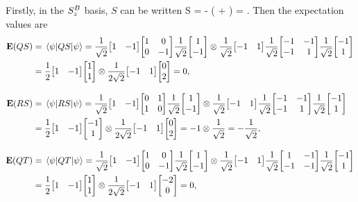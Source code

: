 \begin{solution}
	Firstly, in the $S_z^B$ basis, $S$ can be written
	\beq
		S = - \left( \mqty[ 0 & 1 \\ 1 & 0 ] + \mqty[ 1 & 0 \\ 0 & -1 ] \right)
		=  \mqty[ -1 & -1 \\ -1 & 1 ].
	\eeq
	\clearpage
	Then the expectation values are
	\begin{align*}
		\vE(QS) &= \ev{Q S}{\psi}
		= \frac{1}{\sqrt{2}} \mqty[ 1 & -1 ] \mqty[ 1 & 0 \\ 0 & -1 ] \frac{1}{\sqrt{2}} \mqty[ 1 \\ -1 ] \otimes \frac{1}{\sqrt{2}} \mqty[ -1 & 1 ] \frac{1}{\sqrt{2}} \mqty[ -1 & -1 \\ -1 & 1 ] \frac{1}{\sqrt{2}} \mqty[ -1 \\ 1 ] \\
		&= \frac{1}{2} \mqty[ 1 & -1 ] \mqty[ 1 \\ 1 ] \otimes \frac{1}{2 \sqrt{2}} \mqty[ -1 & 1 ] \mqty[ 0 \\ 2 ]
		= 0, \\[2ex]
		\vE(RS) &= \ev{R S}{\psi}
		= \frac{1}{\sqrt{2}} \mqty[ 1 & -1 ] \mqty[ 0 & 1 \\ 1 & 0 ] \frac{1}{\sqrt{2}} \mqty[ 1 \\ -1 ] \otimes \frac{1}{\sqrt{2}} \mqty[ -1 & 1 ] \frac{1}{\sqrt{2}} \mqty[ -1 & -1 \\ -1 & 1 ] \frac{1}{\sqrt{2}} \mqty[ -1 \\ 1 ] \\
		&= \frac{1}{2} \mqty[ 1 & -1 ] \mqty[ -1 \\ 1 ] \otimes \frac{1}{2 \sqrt{2}} \mqty[ -1 & 1 ] \mqty[ 0 \\ 2 ]
		= -1 \otimes \frac{1}{\sqrt{2}}
		= -\frac{1}{\sqrt{2}}, \\[2ex]
		\vE(QT) &= \ev{Q T}{\psi}
		= \frac{1}{\sqrt{2}} \mqty[ 1 & -1 ] \mqty[ 1 & 0 \\ 0 & -1 ] \frac{1}{\sqrt{2}} \mqty[ 1 \\ -1 ] \otimes \frac{1}{\sqrt{2}} \mqty[ -1 & 1 ] \frac{1}{\sqrt{2}} \mqty[ 1 & -1 \\ -1 & -1 ] \frac{1}{\sqrt{2}} \mqty[ -1 \\ 1 ] \\
		&= \frac{1}{2} \mqty[ 1 & -1 ] \mqty[ 1 \\ 1 ] \otimes \frac{1}{2 \sqrt{2}} \mqty[ -1 & 1 ] \mqty[ -2 \\ 0 ]
		= 0, \\[2ex]

\end{align*}
\end{solution}
